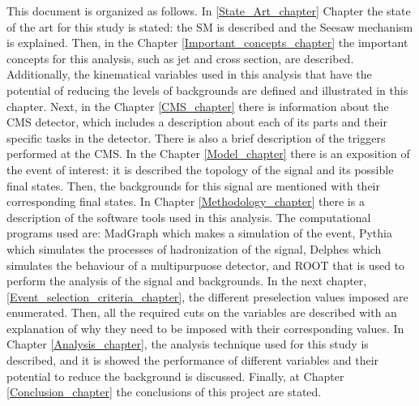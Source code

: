 This document is organized as follows. In \ref{State_Art_chapter} Chapter the state of the art for this study is stated: the SM is described and the Seesaw mechanism is explained. Then, in the Chapter \ref{Important_concepts_chapter} the important concepts for this analysis, such as jet and cross section, are described. Additionally, the kinematical variables used in this analysis that have the potential of reducing the levels of backgrounds are defined and illustrated in this chapter. Next, in the Chapter \ref{CMS_chapter} there is information about the CMS detector, which includes a description about each of its parts and their specific tasks in the detector. There is also a brief description of the triggers performed at the CMS. In the Chapter \ref{Model_chapter} there is an exposition of the event of interest: it is described the topology of the signal and its possible final states. Then, the backgrounds for this signal are mentioned with their corresponding final states. In Chapter \ref{Methodology_chapter} there is a description of the software tools used in this analysis. The computational programs used are: MadGraph which makes a simulation of the event, Pythia which simulates the processes of hadronization of the signal, Delphes which simulates the behaviour of a multipurpuose detector, and ROOT that is used to perform the analysis of the signal and backgrounds. In the next chapter, \ref{Event_selection_criteria_chapter}, the different preselection values imposed are enumerated. Then, all the required cuts on the variables are described with an explanation of why they need to be imposed with their corresponding values. In Chapter \ref{Analysis_chapter}, the analysis technique used for this study is described, and it is showed the performance of different variables and their potential to reduce the background is discussed. Finally, at Chapter \ref{Conclusion_chapter} the conclusions of this project are stated. 
